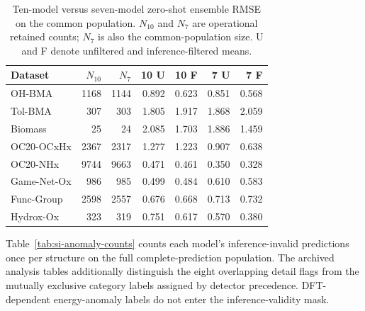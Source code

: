 \begin{table}[ht]
\centering
\caption{Ten-model versus seven-model zero-shot ensemble RMSE on the common population. $N_{10}$ and $N_7$ are operational retained counts; $N_7$ is also the common-population size. U and F denote unfiltered and inference-filtered means.}
\label{tab:si-model-exclusion}
\small
\begin{tabular}{lrrrrrr}
\toprule
Dataset & $N_{10}$ & $N_7$ & 10 U & 10 F & 7 U & 7 F \\
\midrule
OH-BMA & 1168 & 1144 & 0.892 & 0.623 & 0.851 & 0.568 \\
Tol-BMA & 307 & 303 & 1.805 & 1.917 & 1.868 & 2.059 \\
Biomass & 25 & 24 & 2.085 & 1.703 & 1.886 & 1.459 \\
OC20-OCxHx & 2367 & 2317 & 1.277 & 1.223 & 0.907 & 0.638 \\
OC20-NHx & 9744 & 9663 & 0.471 & 0.461 & 0.350 & 0.328 \\
Game-Net-Ox & 986 & 985 & 0.499 & 0.484 & 0.610 & 0.583 \\
Func-Group & 2598 & 2557 & 0.676 & 0.668 & 0.713 & 0.732 \\
Hydrox-Ox & 323 & 319 & 0.751 & 0.617 & 0.570 & 0.380 \\
\bottomrule
\end{tabular}
\end{table}

Table~\ref{tab:si-anomaly-counts} counts each model's inference-invalid predictions once per structure on the full complete-prediction population. The archived analysis tables additionally distinguish the eight overlapping detail flags from the mutually exclusive category labels assigned by detector precedence. DFT-dependent energy-anomaly labels do not enter the inference-validity mask.

